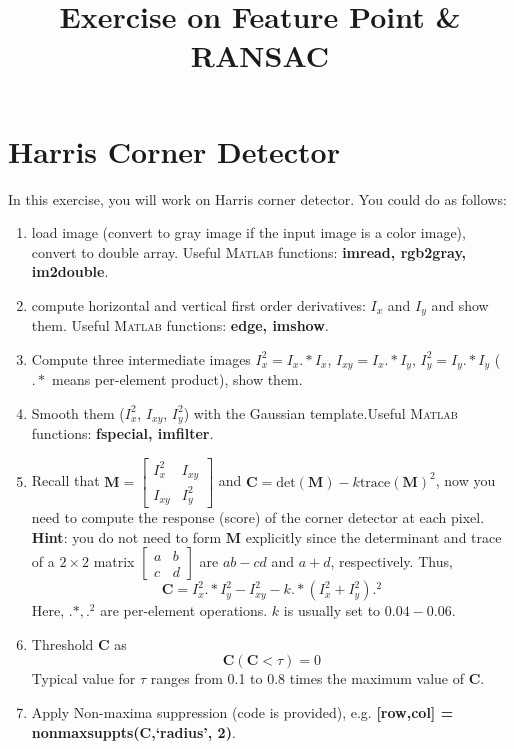 \documentclass[a4paper]{article}
\begin{document}
\title{Exercise on Feature Point \& RANSAC}
\maketitle%

\section{Harris Corner Detector}

In this exercise, you will work on Harris corner detector. You could do as follows:
\begin{enumerate}
\item load image (convert to gray image if the input image is a color image), convert to double array. Useful \textsc{Matlab} functions: \textbf{imread, rgb2gray, im2double}. 
\item compute horizontal and vertical first order derivatives: $I_x$ and $I_y$ and show them. Useful \textsc{Matlab} functions: \textbf{edge, imshow}. 
\item Compute three intermediate images $I_x^2=I_x.*I_x$, $I_{xy}=I_x.*I_y$, $I_y^2=I_y.*I_y$ ($.*$ means per-element product), show them.
\item Smooth them ($I_x^2$, $I_{xy}$, $I_y^2$) with the Gaussian template.Useful \textsc{Matlab} functions: \textbf{fspecial, imfilter}.  
\item Recall that $\mathbf{M}=\left[\begin{matrix}
I_x^2 & I_{xy} \\ I_{xy} & I_y^2
\end{matrix}\right]$ and $\mathbf{C}=\text{det}(\mathbf{M})-k\text{trace}(\mathbf{M})^2$, now you need to compute the response (score) of the corner detector at each pixel. \textbf{Hint}: you do not need to form $\mathbf{M}$ explicitly since the determinant and trace of a $2\times 2$ matrix 
$\left[\begin{matrix}
a & b \\ c & d 
\end{matrix}\right]$ are $ab-cd$ and $a+d$, respectively. Thus, $$\mathbf{C}=I_x^2.*I_y^2-I_{xy}^2-k.*(I_x^2+I_y^2).^2$$
Here, $.*, .^2$ are per-element operations. $k$ is usually set to $0.04-0.06$.
\item Threshold $\mathbf{C}$ as
$$
\mathbf{C}(\mathbf{C}<\tau)=0
$$
Typical value for $\tau$ ranges from 0.1 to 0.8 times the maximum value of $\mathbf{C}$.
\item Apply Non-maxima suppression (code is provided), e.g. \textbf{[row,col] = nonmaxsuppts(C,`radius', 2)}.
\end{enumerate}
\end{document}
